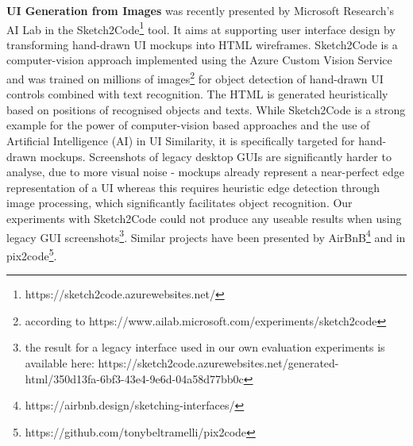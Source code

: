 \textbf{UI Generation from Images} was recently presented by Microsoft Research's AI Lab in the Sketch2Code\footnote{https://sketch2code.azurewebsites.net/} tool.
It aims at supporting user interface design by transforming hand-drawn UI mockups into HTML wireframes.
Sketch2Code is a computer-vision approach implemented using the Azure Custom Vision Service and was trained on millions of images\footnote{according to https://www.ailab.microsoft.com/experiments/sketch2code} for object detection of hand-drawn UI controls combined with text recognition.
The HTML is generated heuristically based on positions of recognised objects and texts.
While Sketch2Code is a strong example for the power of computer-vision based approaches and the use of Artificial Intelligence (AI) in UI Similarity, it is specifically targeted for hand-drawn mockups.
Screenshots of legacy desktop GUIs are significantly harder to analyse, due to more visual noise - mockups already represent a near-perfect edge representation of a UI whereas this requires heuristic edge detection through image processing, which significantly facilitates object recognition.
Our experiments with Sketch2Code could not produce any useable results when using legacy GUI screenshots\footnote{the result for a legacy interface used in our own evaluation experiments \autocite{Heil2016Similarity} is available here: https://sketch2code.azurewebsites.net/generated-html/350d13fa-6bf3-43e4-9e6d-04a58d77bb0c}.
Similar projects have been presented by AirBnB\footnote{https://airbnb.design/sketching-interfaces/} and in pix2code\footnote{https://github.com/tonybeltramelli/pix2code}.

